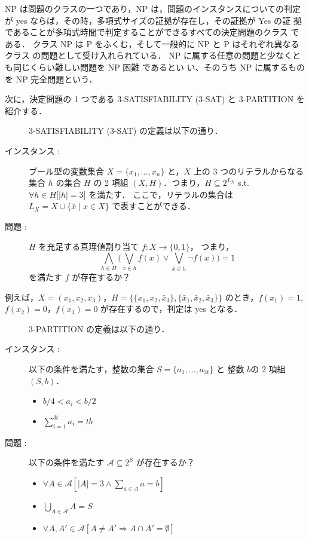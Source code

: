 \documentclass[12pt]{optlab-bachelor}
\begin{document}
NP は問題のクラスの一つであり，NP は，問題のインスタンスについての判定
が yes ならば，その時，多項式サイズの証拠が存在し，その証拠が Yes の証
拠であることが多項式時間で判定することができるすべての決定問題のクラス
である．
クラス NP は P をふくむ，そして一般的に NP と P はそれぞれ異なるクラス
の問題として受け入れられている．
NP に属する任意の問題と少なくとも同じくらい難しい問題を NP 困難 であるとい
い、そのうち NP に属するものを NP 完全問題という．

次に，決定問題の 1 つである \textsc{\textsc{3-SATISFIABILITY}} (\textsc{3-SAT}) と \textsc{3-PARTITION} を紹介する．

\begin{description}
  \item[] \textsc{\textsc{3-SATISFIABILITY}} (\textsc{3-SAT}) の定義は以下の通り．
  \item[インスタンス : ] ブール型の変数集合 $X = \{x_1,\ldots,x_n\}$ と，$X$ 上の 3 つのリテラルからなる集合 $h$ の集合 $H$ の 2 項組 $(X,H)$．つまり，$H \subseteq 2^{L_X}$ s.t. $\forall h \in H \big[|h| = 3\big]$ を満たす．
  ここで，リテラルの集合は $L_X = X \cup \{\bar x \mid x \in X\}$ で表すことができる．
  \item[問題 : ] $H$ を充足する真理値割り当て $f : X \to \{0,1\}$，
  つまり，
  $$\displaystyle \bigwedge_{h \in H} \bigg(\bigvee_{x \in h}f(x) \lor
  \bigvee_{\bar x \in h}\lnot f(x) \bigg) = 1$$
  を満たす $f$ が存在するか？
\end{description}

例えば，$X = (x_1, x_2, x_3)$，$H = \{\{x_1, x_2, \bar x_3\}, \{\bar x_1, \bar x_2, \bar x_3\}\}$ のとき，$f(x_1) = 1$, $f(x_2) = 0$，$f(x_3) = 0$ が存在するので，判定は yes となる．

\begin{description}
  \item[] \textsc{3-PARTITION} の定義は以下の通り．
  \item[インスタンス : ] 以下の条件を満たす，整数の集合 $S = \{a_1,\ldots,a_{3t}\}$ と 整数 $b$の 2 項組 $(S,b)$．
  \begin{itemize}
    \item $b/4 < a_i < b/2$
    \item $\displaystyle \sum_{i = 1}^{3t}a_i = tb$
  \end{itemize}
  \item[問題 : ] 以下の条件を満たす $\mathcal{A} \subseteq 2^S$ が存在するか？
  \begin{itemize}
    \item $\forall A \in \mathcal{A}[|A| = 3 \land \sum_{a \in A} a = b]$
    \item $\bigcup_{A \in \mathcal{A}} A = S$
    \item $\forall A, A' \in \mathcal{A}[A \neq A' \Rightarrow A \cap A' = \emptyset]$
  \end{itemize}
\end{description}
\end{document}
